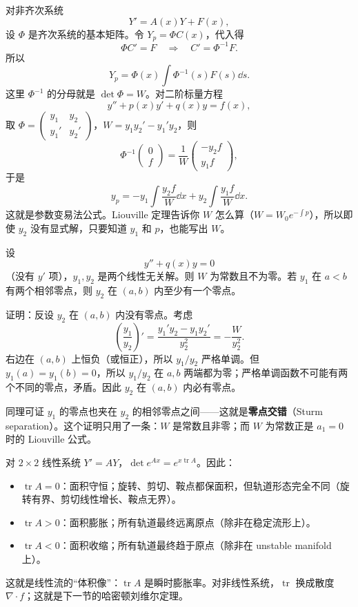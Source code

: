 \documentclass[11pt]{ctexart}
\let\origsubhdr\subhdr
\renewcommand{\subhdr}[1]{\needspace{3\baselineskip}\origsubhdr{#1}}
\newcommand{\tr}{\operatorname{tr}}
\begin{document}
对非齐次系统
\[
Y'=A(x)Y+F(x),
\]
设 $\Phi$ 是齐次系统的基本矩阵。令 $Y_p=\Phi C(x)$，代入得
\[
\Phi C'=F\quad\Longrightarrow\quad
C'=\Phi^{-1}F.
\]
所以
\[
Y_p=\Phi(x)\int\Phi^{-1}(s)F(s)\dd s.
\]
这里 $\Phi^{-1}$ 的分母就是 $\det\Phi=W$。对二阶标量方程
\[
y''+p(x)y'+q(x)y=f(x),
\]
取 $\Phi=\begin{pmatrix}y_1&y_2\\y_1'&y_2'\end{pmatrix}$，$W=y_1y_2'-y_1'y_2$，则
\[
\Phi^{-1}\begin{pmatrix}0\\f\end{pmatrix}
=\frac{1}{W}\begin{pmatrix}-y_2f\\y_1f\end{pmatrix},
\]
于是
\[
y_p=-y_1\int\frac{y_2f}{W}\dd x
+y_2\int\frac{y_1f}{W}\dd x.
\]
这就是参数变易法公式。Liouville 定理告诉你 $W$ 怎么算（$W=W_0e^{-\int p}$），所以即使 $y_2$ 没有显式解，只要知道 $y_1$ 和 $p$，也能写出 $W$。


设
\[
y''+q(x)y=0
\]
（没有 $y'$ 项），$y_1,y_2$ 是两个线性无关解。则 $W$ 为常数且不为零。若 $y_1$ 在 $a<b$ 有两个相邻零点，则 $y_2$ 在 $(a,b)$ 内至少有一个零点。

证明：反设 $y_2$ 在 $(a,b)$ 内没有零点。考虑
\[
\left(\frac{y_1}{y_2}\right)'
=\frac{y_1'y_2-y_1y_2'}{y_2^2}
=-\frac{W}{y_2^2}.
\]
右边在 $(a,b)$ 上恒负（或恒正），所以 $y_1/y_2$ 严格单调。但 $y_1(a)=y_1(b)=0$，所以 $y_1/y_2$ 在 $a,b$ 两端都为零；严格单调函数不可能有两个不同的零点，矛盾。因此 $y_2$ 在 $(a,b)$ 内必有零点。

同理可证 $y_1$ 的零点也夹在 $y_2$ 的相邻零点之间——这就是\textbf{零点交错}（Sturm separation）。这个证明只用了一条：$W$ 是常数且非零；而 $W$ 为常数正是 $a_1=0$ 时的 Liouville 公式。


对 $2\times2$ 线性系统 $Y'=AY$，$\det e^{Ax}=e^{x\tr A}$。因此：
\begin{itemize}
  \item $\tr A=0$：面积守恒；旋转、剪切、鞍点都保面积，但轨道形态完全不同（旋转有界、剪切线性增长、鞍点无界）。
  \item $\tr A>0$：面积膨胀；所有轨道最终远离原点（除非在稳定流形上）。
  \item $\tr A<0$：面积收缩；所有轨道最终趋于原点（除非在 unstable manifold 上）。
\end{itemize}
这就是线性流的“体积像”：$\tr A$ 是瞬时膨胀率。对非线性系统，$\tr$ 换成散度 $\nabla\cdot f$；这就是下一节的哈密顿刘维尔定理。
\end{document}

